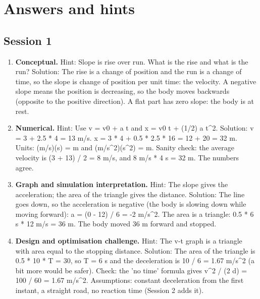 \documentclass[11pt,a4paper]{article}
\begin{document}
\section{Answers and hints}

\subsection*{Session 1}
\begin{enumerate}[nosep]
\item \textbf{Conceptual.} Hint: Slope is rise over run. What is the rise and what is the run? Solution: The rise is a change of position and the run is a change of time, so the slope is change of position per unit time: the velocity. A negative slope means the position is decreasing, so the body moves backwards (opposite to the positive direction). A flat part has zero slope: the body is at rest.
\item \textbf{Numerical.} Hint: Use v = v0 + a t and x = v0 t + (1/2) a t\textasciicircum{}2. Solution: v = 3 + 2.5 * 4 = 13 m/s. x = 3 * 4 + 0.5 * 2.5 * 16 = 12 + 20 = 32 m. Units: (m/s)(s) = m and (m/s\textasciicircum{}2)(s\textasciicircum{}2) = m. Sanity check: the average velocity is (3 + 13) / 2 = 8 m/s, and 8 m/s * 4 s = 32 m. The numbers agree.
\item \textbf{Graph and simulation interpretation.} Hint: The slope gives the acceleration; the area of the triangle gives the distance. Solution: The line goes down, so the acceleration is negative (the body is slowing down while moving forward): a = (0 - 12) / 6 = -2 m/s\textasciicircum{}2. The area is a triangle: 0.5 * 6 s * 12 m/s = 36 m. The body moved 36 m forward and stopped.
\item \textbf{Design and optimisation challenge.} Hint: The v-t graph is a triangle with area equal to the stopping distance. Solution: The area of the triangle is 0.5 * 10 * T = 30, so T = 6 s and the deceleration is 10 / 6 = 1.67 m/s\textasciicircum{}2 (a bit more would be safer). Check: the 'no time' formula gives v\textasciicircum{}2 / (2 d) = 100 / 60 = 1.67 m/s\textasciicircum{}2. Assumptions: constant deceleration from the first instant, a straight road, no reaction time (Session 2 adds it).
\end{enumerate}
\end{document}
